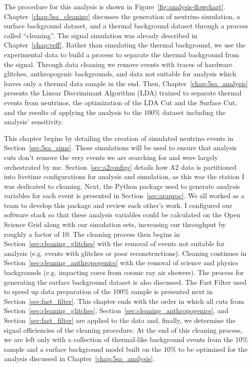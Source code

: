   The procedure for this analysis is shown in Figure~\ref{fig:analysis-flowchart}.
  Chapter~\ref{chap:5sa_cleaning} discusses the generation of neutrino simulation, a surface background dataset, and a thermal background dataset through a process called ``cleaning''.
  The signal simulation was already described in Chapter~\ref{chap:veff}. 
  Rather than simulating the thermal background, we use the experimental data to build a process to separate the thermal background from the signal.
  Through data cleaning we remove events with traces of hardware glitches, anthropogenic backgrounds, and data not suitable for analysis which leaves only a thermal data sample in the end.
  Then, Chapter~\ref{chap:5sa_analysis} presents the Linear Discriminant Algorithm (LDA) trained to separate thermal events from neutrinos, the optimization of the LDA Cut and the Surface Cut, and the results of applying the analysis to the 100\% dataset including the analysis' sensitivity.

  This chapter begins by detailing the creation of simulated neutrino events in Section~\ref{sec:5sa_sims}. 
  These simulations will be used to ensure that analysis cuts don't remove the very events we are searching for and were largely orchestrated by me.
  Section~\ref{sec:a2configs} details how A2 data is partitioned into livetime configurations for analysis and simulation, as this was the station I was dedicated to cleaning.
  Next, the Python package used to generate analysis variables for each event is presented in Section~\ref{sec:araproc}.
  We all worked as a team to develop this package and review each other's work.
  I configured our software stack so that these analysis variables could be calculated on the Open Science Grid along with our simulation sets, increasing our throughput by roughly a factor of 10.
  The cleaning process then begins in Section~\ref{sec:cleaning_glitches} with the removal of events not suitable for analysis (e.g. events with glitches or poor reconstructions).
  Cleaning continues in Section~\ref{sec:cleaning_anthropogenics} with the removal of science and physics backgrounds (e.g. impacting cores from cosmic ray air showers). 
  The process for generating the surface background dataset is also discussed.
  The Fast Filter used to speed up data preparation of the 100\% sample is presented next in Section~\ref{sec:fast_filter}.
  This chapter ends with the order in which all cuts from Section~\ref{sec:cleaning_glitches}, Section~\ref{sec:cleaning_anthropogenics}, and Section~\ref{sec:fast_filter} are applied to the data and, finally, we determine the signal efficiencies of the cleaning procedure.
  At the end of this cleaning process, we are left only with a collection of thermal-like background events from the 10\% sample and a surface background model built on the 10\% to be optimized for the analysis discussed in Chapter~\ref{chap:5sa_analysis}. 
  

